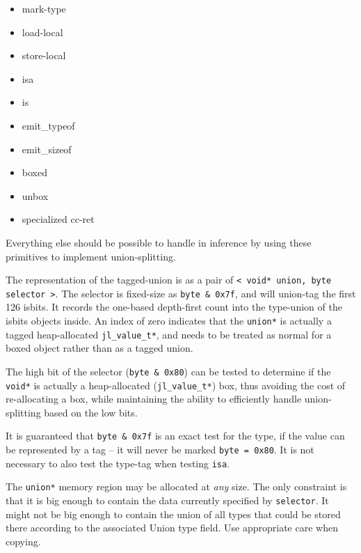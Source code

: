 \begin{itemize}
\item mark-type


\item load-local


\item store-local


\item isa


\item is


\item emit\_typeof


\item emit\_sizeof


\item boxed


\item unbox


\item specialized cc-ret

\end{itemize}


Everything else should be possible to handle in inference by using these primitives to implement union-splitting.



The representation of the tagged-union is as a pair of \texttt{< void* union, byte selector >}. The selector is fixed-size as \texttt{byte \& 0x7f}, and will union-tag the first 126 isbits. It records the one-based depth-first count into the type-union of the isbits objects inside. An index of zero indicates that the \texttt{union*} is actually a tagged heap-allocated \texttt{jl\_value\_t*}, and needs to be treated as normal for a boxed object rather than as a tagged union.



The high bit of the selector (\texttt{byte \& 0x80}) can be tested to determine if the \texttt{void*} is actually a heap-allocated (\texttt{jl\_value\_t*}) box, thus avoiding the cost of re-allocating a box, while maintaining the ability to efficiently handle union-splitting based on the low bits.



It is guaranteed that \texttt{byte \& 0x7f} is an exact test for the type, if the value can be represented by a tag – it will never be marked \texttt{byte = 0x80}. It is not necessary to also test the type-tag when testing \texttt{isa}.



The \texttt{union*} memory region may be allocated at \emph{any} size. The only constraint is that it is big enough to contain the data currently specified by \texttt{selector}. It might not be big enough to contain the union of all types that could be stored there according to the associated Union type field. Use appropriate care when copying.



